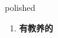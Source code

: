 
\begin{frame}
{\huge polished}
\begin{center}
\begin{enumerate}\Large
  \item \textbf{有教养的}
\end{enumerate}
\end{center}
\end{frame}
